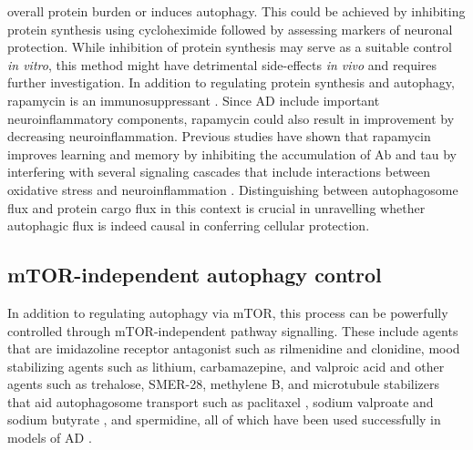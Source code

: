 overall protein burden or induces autophagy. This could be achieved by inhibiting protein synthesis using cycloheximide \citep{Watanabe-Asano2014} followed by assessing markers of neuronal protection. While inhibition of protein synthesis may serve as a suitable control \textit{in vitro}, this method might have detrimental side-effects \textit{in vivo} and requires further investigation. In addition to regulating protein synthesis and autophagy, rapamycin is an immunosuppressant \citep{Khanna2000,Mohacsi1992,Wicker1990}. Since AD include important neuroinflammatory components, rapamycin could also result in improvement by decreasing neuroinflammation. Previous studies have shown that rapamycin improves learning and memory by inhibiting the accumulation of Ab and tau by interfering with several signaling cascades \citep{Liu2013,Liu2013a,Maiese2012} that include interactions between oxidative stress and neuroinflammation \citep{Agostinho2010,Galimberti2011}. Distinguishing between autophagosome flux and protein cargo flux in this context is crucial in unravelling whether autophagic flux is indeed causal in conferring cellular protection. 

\subsection{mTOR-independent autophagy control}
In addition to regulating autophagy via mTOR, this process can be powerfully controlled through mTOR-independent pathway signalling. These include agents that are imidazoline receptor antagonist such as rilmenidine and clonidine, mood stabilizing agents such as lithium, carbamazepine, and valproic acid and other agents such as trehalose, SMER-28, methylene B, and microtubule stabilizers that aid autophagosome transport such as paclitaxel \citep{Zhang2015}, sodium valproate and sodium butyrate \citep{Guan2009,Kilgore2010}, and spermidine, all of which have been used successfully in models of AD \citep{Congdon2012,Medina2011,Perucho2012,Schaeffer2012,Shimada2012,Tian2011,Zhang2011}.

